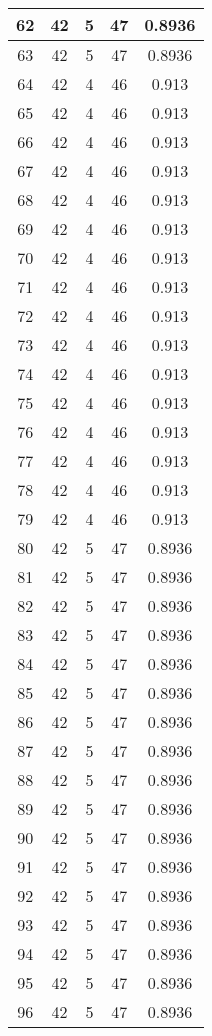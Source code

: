 \documentclass[letterpaper, 12pt]{article}
\begin{document}
\begin{longtable}{|c|c|c|c|c|}
\hline
62 & 42 & 5 & 47 & 0.8936 \\
\hline
63 & 42 & 5 & 47 & 0.8936 \\
\hline
64 & 42 & 4 & 46 & 0.913 \\
\hline
65 & 42 & 4 & 46 & 0.913 \\
\hline
66 & 42 & 4 & 46 & 0.913 \\
\hline
67 & 42 & 4 & 46 & 0.913 \\
\hline
68 & 42 & 4 & 46 & 0.913 \\
\hline
69 & 42 & 4 & 46 & 0.913 \\
\hline
70 & 42 & 4 & 46 & 0.913 \\
\hline
71 & 42 & 4 & 46 & 0.913 \\
\hline
72 & 42 & 4 & 46 & 0.913 \\
\hline
73 & 42 & 4 & 46 & 0.913 \\
\hline
74 & 42 & 4 & 46 & 0.913 \\
\hline
75 & 42 & 4 & 46 & 0.913 \\
\hline
76 & 42 & 4 & 46 & 0.913 \\
\hline
77 & 42 & 4 & 46 & 0.913 \\
\hline
78 & 42 & 4 & 46 & 0.913 \\
\hline
79 & 42 & 4 & 46 & 0.913 \\
\hline
80 & 42 & 5 & 47 & 0.8936 \\
\hline
81 & 42 & 5 & 47 & 0.8936 \\
\hline
82 & 42 & 5 & 47 & 0.8936 \\
\hline
83 & 42 & 5 & 47 & 0.8936 \\
\hline
84 & 42 & 5 & 47 & 0.8936 \\
\hline
85 & 42 & 5 & 47 & 0.8936 \\
\hline
86 & 42 & 5 & 47 & 0.8936 \\
\hline
87 & 42 & 5 & 47 & 0.8936 \\
\hline
88 & 42 & 5 & 47 & 0.8936 \\
\hline
89 & 42 & 5 & 47 & 0.8936 \\
\hline
90 & 42 & 5 & 47 & 0.8936 \\
\hline
91 & 42 & 5 & 47 & 0.8936 \\
\hline
92 & 42 & 5 & 47 & 0.8936 \\
\hline
93 & 42 & 5 & 47 & 0.8936 \\
\hline
94 & 42 & 5 & 47 & 0.8936 \\
\hline
95 & 42 & 5 & 47 & 0.8936 \\
\hline
96 & 42 & 5 & 47 & 0.8936 \\

\end{longtable}
\end{document}
